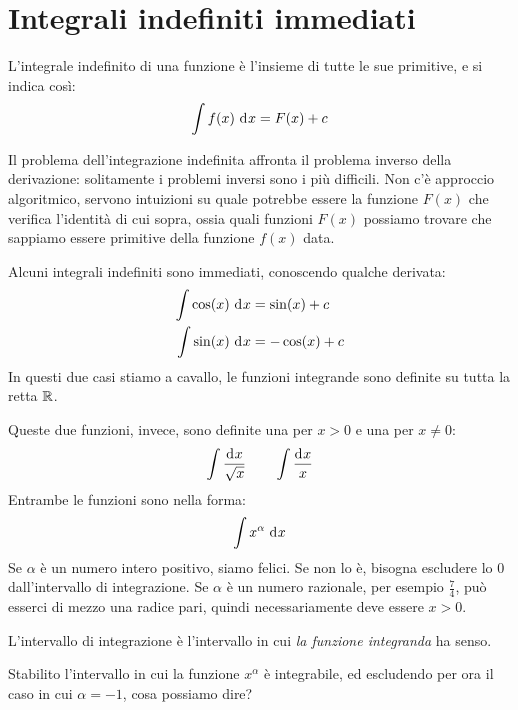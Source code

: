 \section{Integrali indefiniti immediati}
\label{integrali_indefiniti_immediati}

\begin{defn}
L'integrale indefinito di una funzione \`e l'insieme di tutte le sue primitive, e si indica cos\`i:
\[
\int f(x) \dx = F(x) + c
\]
\end{defn}
Il problema dell'integrazione indefinita affronta il problema inverso della derivazione: solitamente i problemi inversi sono i pi\`u difficili. Non c'\`e approccio algoritmico, servono intuizioni su quale potrebbe essere la funzione $F(x)$ che verifica l'identit\`a di cui sopra, ossia quali funzioni $F(x)$ possiamo trovare che sappiamo essere primitive della funzione $f(x)$ data.

Alcuni integrali indefiniti sono immediati, conoscendo qualche derivata:
\begin{align*}
\int \cos (x) \dx &= \sin (x) + c \\
\int \sin (x) \dx &= - \cos (x) + c
\end{align*}
In questi due casi stiamo a cavallo, le funzioni integrande sono definite su tutta la retta $\mathbb{R}$.

Queste due funzioni, invece, sono definite una per $x > 0$ e una per $x \neq 0$:
\[
\int \frac{\diff x}{\sqrt{x}} \qquad
\int \frac{\diff x}{x}
\]
Entrambe le funzioni sono nella forma:
\[
\int x^{\alpha} \dx
\]
Se $\alpha$ \`e un numero intero positivo, siamo felici. Se non lo \`e, bisogna escludere lo 0 dall'intervallo di integrazione. Se $\alpha$ \`e un numero razionale, per esempio $\frac{7}{4}$, pu\`o esserci di mezzo una radice pari, quindi necessariamente deve essere $x > 0$.

L'intervallo di integrazione \`e l'intervallo in cui \emph{la funzione integranda} ha senso.

Stabilito l'intervallo in cui la funzione $x^{\alpha}$ \`e integrabile, ed escludendo per ora il caso in cui $\alpha = -1$, cosa possiamo dire? 

